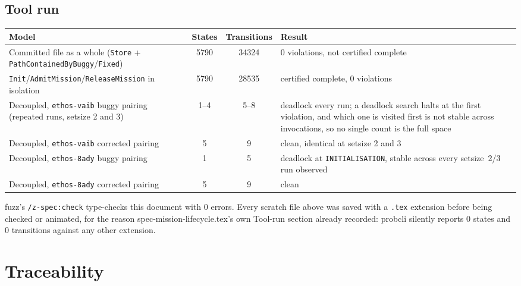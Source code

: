 \documentclass[a4paper,10pt,fleqn]{article}
\newcommand{\field}[1]{\texttt{#1}}
\begin{document}
\subsection{Tool run}
\label{sec:probrun}

\begin{center}
\begin{tabularx}{\textwidth}{@{}lccl@{}}
\toprule
\textbf{Model} & \textbf{States} & \textbf{Transitions} & \textbf{Result} \\
\midrule
Committed file as a whole (\field{Store} +
  \field{PathContainedByBuggy}/\field{Fixed}) & 5790 & 34324 & 0
  violations, not certified complete \\
\field{Init}/\field{AdmitMission}/\field{ReleaseMission} in
  isolation & 5790 & 28535 & certified complete, 0 violations \\
Decoupled, \field{ethos-vaib} buggy pairing (repeated runs,
  setsize 2 and 3) & 1--4 & 5--8 & deadlock every run; a deadlock
  search halts at the first violation, and which one is visited
  first is not stable across invocations, so no single count is the
  full space \\
Decoupled, \field{ethos-vaib} corrected pairing & 5 & 9 & clean,
  identical at setsize 2 and 3 \\
Decoupled, \field{ethos-8ady} buggy pairing & 1 & 5 & deadlock at
  \field{INITIALISATION}, stable across every setsize~2/3 run
  observed \\
Decoupled, \field{ethos-8ady} corrected pairing & 5 & 9 & clean \\
\bottomrule
\end{tabularx}
\end{center}

fuzz's \texttt{/z-spec:check} type-checks this document with 0 errors.
Every scratch file above was saved with a \texttt{.tex} extension
before being checked or animated, for the reason
spec-mission-lifecycle.tex's own Tool-run section already recorded:
probcli silently reports 0 states and 0 transitions against any other
extension.

\section{Traceability}
\label{sec:trace}
\end{document}
